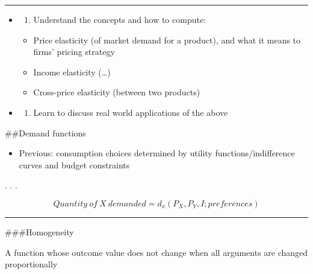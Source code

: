 \documentclass[]{article}
\providecommand{\tightlist}{%
  \setlength{\itemsep}{0pt}\setlength{\parskip}{0pt}}
\begin{document}
\begin{center}\rule{0.5\linewidth}{\linethickness}\end{center}

\begin{itemize}
\item
  \begin{enumerate}
  \def\labelenumi{\arabic{enumi}.}
  \setcounter{enumi}{3}
  \tightlist
  \item
    Understand the concepts and how to compute:
  \end{enumerate}

  \begin{itemize}
  \tightlist
  \item
    Price elasticity (of market demand for a product), and what it means
    to firms' pricing strategy
  \item
    Income elasticity (\ldots)
  \item
    Cross-price elasticity (between two products)
  \end{itemize}
\item
  \begin{enumerate}
  \def\labelenumi{\arabic{enumi}.}
  \setcounter{enumi}{4}
  \tightlist
  \item
    Learn to discuss real world applications of the above
  \end{enumerate}
\end{itemize}

\#\#Demand functions

\begin{itemize}
\tightlist
\item
  Previous: consumption choices determined by utility
  functions/indifference curves and budget constraints
\end{itemize}

. . .

\[Quantity \: of \: X \: demanded = d_x(P_X, P_Y, I; preferences)\]


\begin{center}\rule{0.5\linewidth}{\linethickness}\end{center}

\#\#\#Homogeneity

\begin{description}
\tightlist
\item[Homogeneous (of degree zero) (demand) function]
A function whose outcome value does not change when all arguments are
changed proportionally
\end{description}
\end{document}
